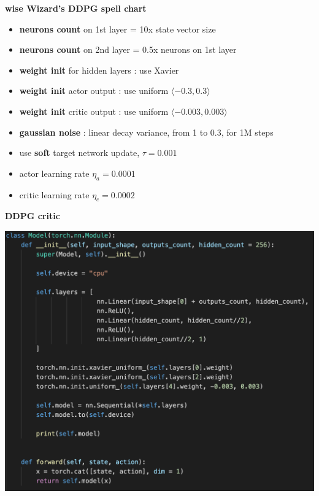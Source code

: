 \documentclass[xcolor=dvipsnames]{beamer}
\begin{document}
\begin{frame}{\bf wise Wizard's DDPG spell chart}
  \begin{itemize}
    \item {\bf \color{red} neurons count} on 1st layer = 10x  state vector size
    \item {\bf \color{red} neurons count} on 2nd layer = 0.5x neurons on 1st layer
    \item {\bf \color{red} weight init} for hidden layers : use Xavier
    \item {\bf \color{red} weight init} actor output  : use uniform $\langle -0.3, 0.3 \rangle$
    \item {\bf \color{red} weight init} critic output : use uniform $\langle -0.003, 0.003 \rangle$
    \item {\bf \color{red} gaussian noise} : linear decay variance, from 1 to 0.3, for 1M steps 
    \item use {\bf \color{red} soft} target network update, $\tau = 0.001$
    \item actor learning rate $\eta_a = 0.0001$
    \item critic learning rate $\eta_c = 0.0002$
  \end{itemize}
\end{frame}


\begin{frame}{\bf DDPG critic}

  {\centering \includegraphics[scale=0.4]{../images/ddpg_critic.png}}
\end{frame}
\end{document}
